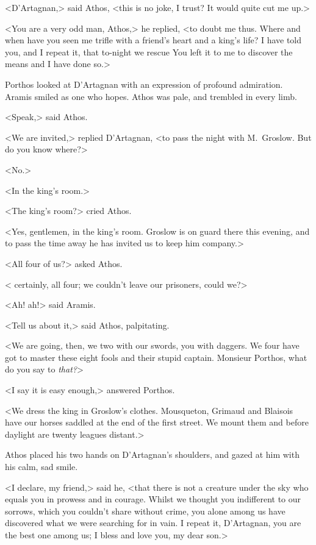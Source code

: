 <D'Artagnan,> said Athos, <this is no joke, I trust? It would quite cut me up.>

<You are a very odd man, Athos,> he replied, <to doubt me thus. Where and when have you seen me trifle with a friend's heart and a king's life? I have told you, and I repeat it, that to-night we rescue   You left it to me to discover the means and I have done so.>

Porthos looked at D'Artagnan with an expression of profound admiration. Aramis smiled as one who hopes. Athos was pale, and trembled in every limb.

<Speak,> said Athos.

<We are invited,> replied D'Artagnan, <to pass the night with M.~Groslow. But do you know where?>

<No.>

<In the king's room.>

<The king's room?> cried Athos.

<Yes, gentlemen, in the king's room. Groslow is on guard there this evening, and to pass the time away he has invited us to keep him company.>

<All four of us?> asked Athos.

< certainly, all four; we couldn't leave our prisoners, could we?>

<Ah! ah!> said Aramis.

<Tell us about it,> said Athos, palpitating.

<We are going, then, we two with our swords, you with daggers. We four have got to master these eight fools and their stupid captain. Monsieur Porthos, what do you say to \emph{that?}>

<I say it is easy enough,> answered Porthos.

<We dress the king in Groslow's clothes. Mousqueton, Grimaud and Blaisois have our horses saddled at the end of the first street. We mount them and before daylight are twenty leagues distant.>

Athos placed his two hands on D'Artagnan's shoulders, and gazed at him with his calm, sad smile.

<I declare, my friend,> said he, <that there is not a creature under the sky who equals you in prowess and in courage. Whilst we thought you indifferent to our sorrows, which you couldn't share without crime, you alone among us have discovered what we were searching for in vain. I repeat it, D'Artagnan, you are the best one among us; I bless and love you, my dear son.>

